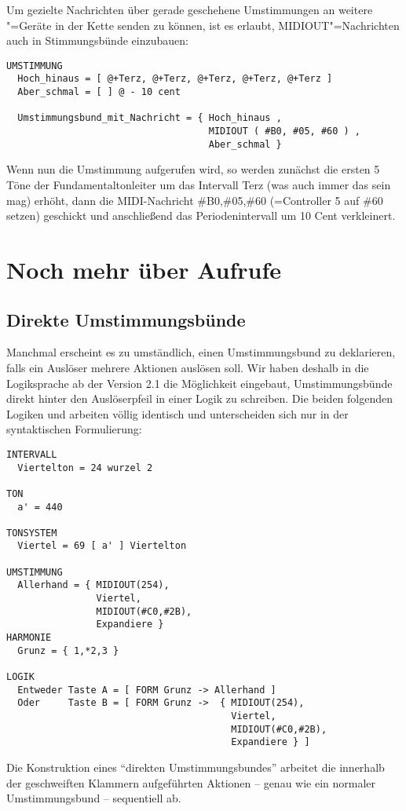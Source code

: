 Um gezielte Nachrichten über gerade geschehene Umstimmungen an weitere
\mutabor{}"=Geräte in der Kette senden zu können, ist es erlaubt,
MIDIOUT"=Nachrichten auch in Stimmungsbünde einzubauen:
\begin{verbatim}
UMSTIMMUNG
  Hoch_hinaus = [ @+Terz, @+Terz, @+Terz, @+Terz, @+Terz ]
  Aber_schmal = [ ] @ - 10 cent
  
  Umstimmungsbund_mit_Nachricht = { Hoch_hinaus ,
                                    MIDIOUT ( #B0, #05, #60 ) ,
                                    Aber_schmal }
\end{verbatim}
Wenn nun die Umstimmung 
aufgerufen wird, so werden zunächst die ersten 5 Töne der
Fundamentaltonleiter um das Intervall Terz (was auch immer das sein
mag) erhöht, dann die MIDI-Nachricht \#B0,\#05,\#60 (=Controller 5 auf
\#60 setzen) geschickt und anschließend das Periodenintervall um 10
Cent verkleinert.

\chapter{Noch mehr über Aufrufe}\label{cha:noch-mehr-uber}
\section{Direkte Umstimmungsbünde}\label{sec:direkte-umst}
Manchmal erscheint es zu umständlich, einen Umstimmungsbund zu
deklarieren, falls ein Auslöser mehrere Aktionen auslösen soll. Wir
haben deshalb in die Logiksprache ab der Version 2.1 die Möglichkeit
eingebaut, Umstimmungsbünde direkt hinter den Auslöserpfeil in einer
Logik zu schreiben. Die beiden folgenden Logiken  und
 arbeiten völlig identisch und unterscheiden sich nur in der
syntaktischen Formulierung:
\begin{verbatim}
INTERVALL
  Viertelton = 24 wurzel 2

TON
  a' = 440

TONSYSTEM
  Viertel = 69 [ a' ] Viertelton

UMSTIMMUNG
  Allerhand = { MIDIOUT(254),
                Viertel,
                MIDIOUT(#C0,#2B),
                Expandiere }
HARMONIE
  Grunz = { 1,*2,3 }

LOGIK
  Entweder Taste A = [ FORM Grunz -> Allerhand ]
  Oder     Taste B = [ FORM Grunz ->  { MIDIOUT(254),
                                        Viertel,
                                        MIDIOUT(#C0,#2B),
                                        Expandiere } ]
\end{verbatim}
Die Konstruktion eines "`direkten Umstimmungsbundes"' arbeitet die
innerhalb der geschweiften Klammern aufgeführten Aktionen -- genau wie
ein normaler Umstimmungsbund -- sequentiell ab.

